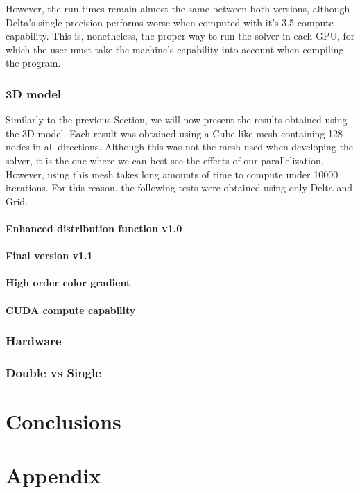 \documentclass[12pt]{book}
\begin{document}
  However, the run-times remain almost the same between both versions, although Delta's single precision performs worse when computed with it's 3.5 compute capability. This is, nonetheless, the proper way to run the solver in each GPU, for which the user must take the machine's capability into account when compiling the program.
 
\subsection{3D model}
Similarly to the previous Section, we will now present the results obtained using the 3D model. Each result was obtained using a Cube-like mesh containing 128 nodes in all directions. Although this was not the mesh used when developing the solver, it is the one where we can best see the effects of our parallelization. However, using this mesh takes long amounts of time to compute under 10000 iterations. For this reason, the following tests were obtained using only Delta and Grid. 
\subsubsection{Enhanced distribution function v1.0}
\subsubsection{Final version v1.1}
\subsubsection{High order color gradient}
\subsubsection{CUDA compute capability}
\subsection{Hardware}
\subsection{Double vs Single}
\chapter{Conclusions}

\backmatter
{}


\appendix
\chapter{Appendix}
\end{document}
